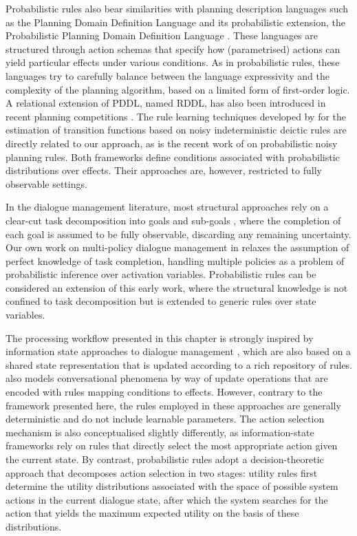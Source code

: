 Probabilistic rules also bear similarities with planning description languages such as the Planning Domain Definition Language \citep[PDDL, see ][]{mcdermott1998} and its probabilistic extension, the Probabilistic Planning Domain Definition Language \citep[PPDDL, see ][]{younes2004ppddl1}.  These languages are structured through action schemas that specify how (parametrised) actions can yield particular effects under various conditions. As in probabilistic rules, these languages try to carefully balance between the language expressivity and the complexity of the planning algorithm, based on a limited form of first-order logic. A relational extension of PDDL, named RDDL, has also been introduced in recent planning competitions \citep{Sanner:RDDL}. The rule learning techniques developed by \cite{PasulaZK07} for the estimation of transition functions based on noisy indeterministic deictic rules are directly related to our approach, as is the recent work of \cite{lang10jair} on probabilistic noisy planning rules.   Both frameworks define conditions associated with probabilistic distributions over effects. Their approaches are, however, restricted to fully observable settings. 

In the dialogue management literature, most structural approaches rely on a clear-cut task decomposition into goals and sub-goals \citep{Allen:2000:AGD:973935.973937,Steedman-Petrick:07,Bohus:2009}, where the completion of each goal is assumed to be fully observable, discarding any remaining uncertainty.  Our own work on multi-policy dialogue management in \cite{multipolicy-sigdial2011} relaxes the assumption of perfect knowledge of task completion, handling multiple policies as a problem of probabilistic inference over activation variables.  Probabilistic rules can be considered an extension of this early work, where the structural knowledge is not confined to task decomposition but is extended to generic rules over state variables.  

The processing workflow presented in this chapter is strongly inspired by information state approaches to dialogue management \citep{Larsson:2000,Bos2003}, which are also based on a shared state representation that is updated according to a rich repository of rules.  \cite{Ginzburg2012} also models conversational phenomena by way of update operations that are encoded with rules mapping conditions to effects. However, contrary to the framework presented here, the rules employed in these approaches are generally deterministic and do not include learnable parameters. The action selection mechanism is also conceptualised slightly differently, as information-state frameworks rely on rules that directly select the most appropriate action given the current state. By contrast, probabilistic rules adopt a decision-theoretic approach that decomposes action selection in two stages: utility rules first determine the utility distributions associated with the space of possible system actions in the current dialogue state, after which the system searches for the action that yields the maximum expected utility on the basis of these distributions.  


